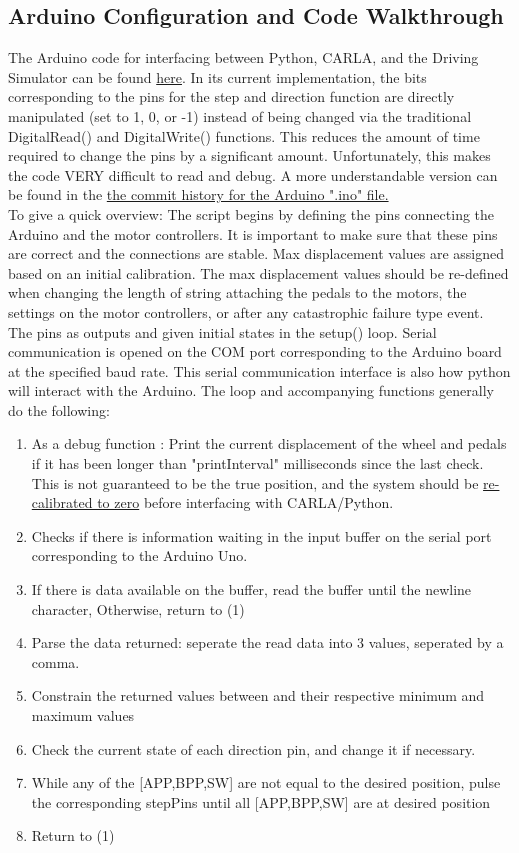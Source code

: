 \documentclass[12pt,oneside,letterpaper]{article}
\begin{document}
\subsection{Arduino Configuration and Code Walkthrough}
The Arduino code for interfacing between Python, CARLA, and the Driving Simulator can be found \href{https://github.com/hrwhite21/DriverlessDIL/blob/main/PythonToMotor/PythonToMotor.ino}{here}. In its current implementation, the bits corresponding to the pins for the step and direction function are directly manipulated (set to 1, 0, or -1) instead of being changed via the traditional DigitalRead() and DigitalWrite() functions. This reduces the amount of time required to change the pins by a significant amount. Unfortunately, this makes the code VERY difficult to read and debug. A more understandable version can be found in the \href{https://tinyurl.com/2s4kpnuv}{the commit history for the Arduino ".ino" file.}
\\
To give a quick overview: The script begins by defining the pins connecting the Arduino and the motor controllers. It is important to make sure that these pins are correct and the connections are stable. Max displacement values are assigned based on an initial calibration. The max displacement values should be re-defined when changing the length of string attaching the pedals to the motors, the settings on the motor controllers, or after any catastrophic failure type event. The pins as outputs and given initial states in the setup() loop. Serial communication is opened on the COM port corresponding to the Arduino board at the specified baud rate. This serial communication interface is also how python will interact with the Arduino. The loop and accompanying functions generally do the following: 
\begin{enumerate}
\item As a debug function : Print the current displacement of the wheel and pedals if it has been longer than "printInterval" milliseconds since the last check. This is not guaranteed to be the true position, and the system should be \hyperref[sec:Calibration]{re-calibrated to zero} before interfacing with CARLA/Python.
\item Checks if there is information waiting in the input buffer on the serial port corresponding to the Arduino Uno. 
\item If there is data available on the buffer, read the buffer until the newline character, Otherwise, return to (1)
\item Parse the data returned: seperate the read data into 3 values, seperated by a comma.
\item Constrain the returned values between and their respective minimum and maximum values
\item Check the current state of each direction pin, and change it if necessary.
\item While any of the [APP,BPP,SW] are not equal to the desired position, pulse the corresponding stepPins until all [APP,BPP,SW] are at desired position
\item Return to (1) 
\end{enumerate}
\end{document}
